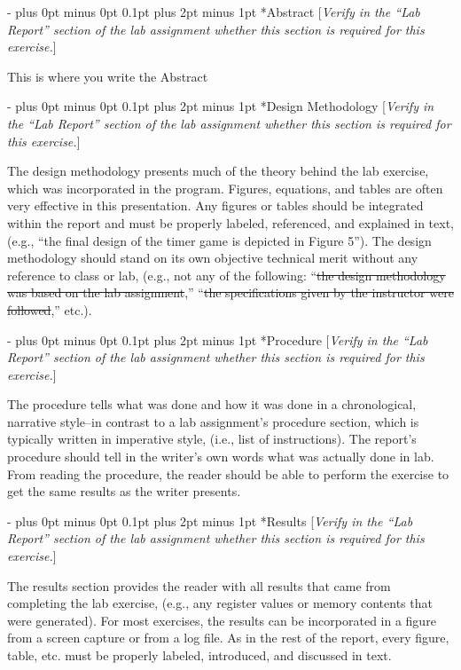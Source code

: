 \documentclass[\FontSize\FontUnit,letterpaper,oneside]{article}
\makeatletter
\renewcommand \section{
    \@startsection{section}{1}{\z@}
      {\dimexpr \FontSize\FontUnit * 2 - \parskip \relax plus 0pt minus 0pt}
      {0.1pt plus 2pt minus 1pt} %
      {\normalfont\normalsize\bfseries}}
\makeatother
\begin{document}
\section*{Abstract}
  [\textit{Verify in the ``Lab Report'' section of the lab assignment
    whether this section is required for this exercise.}]
\par This is where you write the Abstract
\section*{Design Methodology}
[\textit{Verify in the ``Lab Report'' section of the lab assignment
  whether this section is required for this exercise.}]
\par The design methodology presents much of the theory behind the lab
  exercise, which was incorporated in the program.  Figures, equations,
  and tables are often very effective in this presentation.  Any figures
  or tables should be integrated within the report and must be properly
  labeled, referenced, and explained in text, (e.g., ``the final design
  of the timer game is depicted in Figure 5'').  The design methodology
  should stand on its own objective technical merit without any
  reference to class or lab, (e.g., not any of the following: 
  ``\sout{the design methodology was based on the lab assignment},''
  ``\sout{the specifications given by the instructor were followed},''
  etc.).
\section*{Procedure}
[\textit{Verify in the ``Lab Report'' section of the lab assignment
  whether this section is required for this exercise.}]
\par The procedure tells what was done and how it was done in a
  chronological, narrative style--in contrast to a lab assignment’s
  procedure section, which is typically written in imperative style,
  (i.e., list of instructions).  The report’s procedure should tell in
  the writer’s own words what was actually done in lab.  From reading
  the procedure, the reader should be able to perform the exercise to
  get the same results as the writer presents.
\section*{Results}
[\textit{Verify in the ``Lab Report'' section of the lab assignment
  whether this section is required for this exercise.}]
\par The results section provides the reader with all results that came from
  completing the lab exercise, (e.g., any register values or memory
  contents that were generated).  For most exercises, the results can be
  incorporated in a figure from a screen capture or from a log file. 
  As in the rest of the report, every figure, table, etc. must be
  properly labeled, introduced, and discussed in text.
\end{document}
